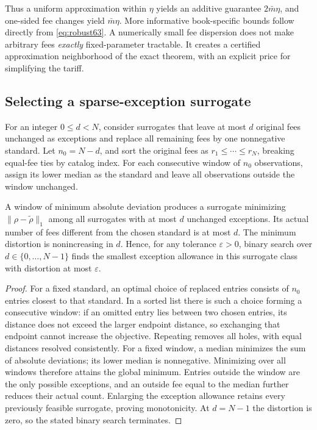 Thus a uniform approximation within $\eta$ yields an additive guarantee $2\bar m\eta$, and one-sided fee changes yield $\bar m\eta$. More informative book-specific bounds follow directly from \eqref{eq:robust63}. A numerically small fee dispersion does not make arbitrary fees \emph{exactly} fixed-parameter tractable. It creates a certified approximation neighborhood of the exact theorem, with an explicit price for simplifying the tariff.

\subsection{Selecting a sparse-exception surrogate}
For an integer $0\leq d<N$, consider surrogates that leave at most $d$ original fees unchanged as exceptions and replace all remaining fees by one nonnegative standard. Let $n_0=N-d$, and sort the original fees as $r_1\leq\cdots\leq r_N$, breaking equal-fee ties by catalog index. For each consecutive window of $n_0$ observations, assign its lower median as the standard and leave all observations outside the window unchanged.
\begin{proposition}\label{prop:projection63}
A window of minimum absolute deviation produces a surrogate minimizing $\|\rho-\widetilde\rho\|_1$ among all surrogates with at most $d$ unchanged exceptions. Its actual number of fees different from the chosen standard is at most $d$. The minimum distortion is nonincreasing in $d$. Hence, for any tolerance $\varepsilon>0$, binary search over $d\in\{0,\ldots,N-1\}$ finds the smallest exception allowance in this surrogate class with distortion at most $\varepsilon$.
\end{proposition}
\begin{proof}
For a fixed standard, an optimal choice of replaced entries consists of $n_0$ entries closest to that standard. In a sorted list there is such a choice forming a consecutive window: if an omitted entry lies between two chosen entries, its distance does not exceed the larger endpoint distance, so exchanging that endpoint cannot increase the objective. Repeating removes all holes, with equal distances resolved consistently. For a fixed window, a median minimizes the sum of absolute deviations; its lower median is nonnegative. Minimizing over all windows therefore attains the global minimum. Entries outside the window are the only possible exceptions, and an outside fee equal to the median further reduces their actual count. Enlarging the exception allowance retains every previously feasible surrogate, proving monotonicity. At $d=N-1$ the distortion is zero, so the stated binary search terminates.
\end{proof}


